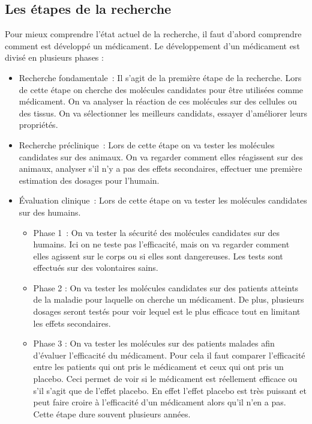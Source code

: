 \documentclass[12pt,a4paper]{report}
\begin{document}
\begin{appendix}

    \chapter{Les étapes de la recherche} \label{annexe:etapes_recherche}

    Pour mieux comprendre l'état actuel de la recherche, il faut d'abord comprendre comment est développé un médicament.
Le développement d'un médicament est divisé en plusieurs phases : \cite{DeveloppementMedicamentInserm}

\begin{itemize}
    \item Recherche fondamentale : Il s'agit de la première étape de la recherche.
    Lors de cette étape on cherche des molécules candidates pour être utilisées comme médicament.
    On va analyser la réaction de ces molécules sur des cellules ou des tissus.
    On va sélectionner les meilleurs candidats, essayer d'améliorer leurs propriétés.

    \item Recherche préclinique : Lors de cette étape on va tester les molécules candidates sur des animaux.
    On va regarder comment elles réagissent sur des animaux, analyser s'il n'y a pas des effets secondaires, effectuer une première estimation des dosages pour l'humain.

    \item Évaluation clinique : Lors de cette étape on va tester les molécules candidates sur des humains.

    \begin{itemize}
        \item Phase 1 : On va tester la sécurité des molécules candidates sur des humains. Ici on ne teste pas l'efficacité, mais on va regarder comment elles agissent sur le corps ou si elles sont dangereuses. Les tests sont effectués sur des volontaires sains.
        \item Phase 2 : On va tester les molécules candidates sur des patients atteints de la maladie pour laquelle on cherche un médicament. De plus, plusieurs dosages seront testés pour voir lequel est le plus efficace tout en limitant les effets secondaires.
        \item Phase 3 : On va tester les molécules sur des patients malades afin d'évaluer l'efficacité du médicament. Pour cela il faut comparer l'efficacité entre les patients qui ont pris le médicament et ceux qui ont pris un placebo. Ceci permet de voir si le médicament est réellement efficace ou s'il s'agit que de l'effet placebo. En effet l'effet placebo est très puissant et peut faire croire à l'efficacité d'un médicament alors qu'il n'en a pas. \cite{decraenPlacebosPlaceboEffects1999} Cette étape dure souvent plusieurs années.
    \end{itemize}


\end{itemize}
\end{appendix}
\end{document}
